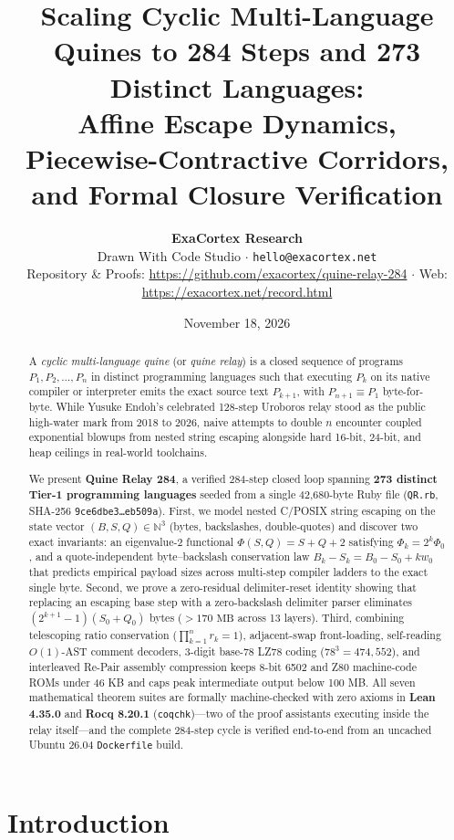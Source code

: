\documentclass[10pt,twocolumn]{article}
\title{\vspace{-1.0em}\textbf{Scaling Cyclic Multi-Language Quines to 284 Steps and 273 Distinct Languages:\\[0.25em]
\large Affine Escape Dynamics, Piecewise-Contractive Corridors, and Formal Closure Verification}}
\author{
  \textbf{ExaCortex Research} \\
  \small Drawn With Code Studio $\cdot$ \texttt{hello@exacortex.net} \\
  \small Repository \& Proofs: \url{https://github.com/exacortex/quine-relay-284} $\cdot$ Web: \url{https://exacortex.net/record.html}
}
\date{\small November 18, 2026}
\theoremstyle{definition}
\begin{document}
\maketitle

\begin{abstract}
\noindent
A \emph{cyclic multi-language quine} (or \emph{quine relay}) is a closed sequence of programs $P_1, P_2, \dots, P_n$ in distinct programming languages such that executing $P_k$ on its native compiler or interpreter emits the exact source text $P_{k+1}$, with $P_{n+1} \equiv P_1$ byte-for-byte. While Yusuke Endoh's celebrated 128-step Uroboros relay stood as the public high-water mark from 2018 to 2026, naive attempts to double $n$ encounter coupled exponential blowups from nested string escaping alongside hard 16-bit, 24-bit, and heap ceilings in real-world toolchains.

We present \textbf{Quine Relay 284}, a verified 284-step closed loop spanning \textbf{273 distinct Tier-1 programming languages} seeded from a single 42,680-byte Ruby file (\texttt{QR.rb}, SHA-256 \texttt{9ce6dbe3\dots eb509a}). First, we model nested C/POSIX string escaping on the state vector $(B, S, Q) \in \mathbb{N}^3$ (bytes, backslashes, double-quotes) and discover two exact invariants: an eigenvalue-2 functional $\Phi(S, Q) = S + Q + 2$ satisfying $\Phi_k = 2^k \Phi_0$, and a quote-independent byte--backslash conservation law $B_k - S_k = B_0 - S_0 + k w_0$ that predicts empirical payload sizes across multi-step compiler ladders to the exact single byte. Second, we prove a zero-residual delimiter-reset identity showing that replacing an escaping base step with a zero-backslash delimiter parser eliminates $(2^{k+1} - 1)(S_0 + Q_0)$ bytes ($>170\text{ MB}$ across 13 layers). Third, combining telescoping ratio conservation ($\prod_{k=1}^n r_k = 1$), adjacent-swap front-loading, self-reading $O(1)$-AST comment decoders, 3-digit base-78 LZ78 coding ($78^3 = 474{,}552$), and interleaved Re-Pair assembly compression keeps 8-bit 6502 and Z80 machine-code ROMs under 46 KB and caps peak intermediate output below 100 MB. All seven mathematical theorem suites are formally machine-checked with zero axioms in \textbf{Lean 4.35.0} and \textbf{Rocq 8.20.1} (\texttt{coqchk})---two of the proof assistants executing inside the relay itself---and the complete 284-step cycle is verified end-to-end from an uncached Ubuntu 26.04 \texttt{Dockerfile} build.
\end{abstract}

\section{Introduction}
\end{document}
